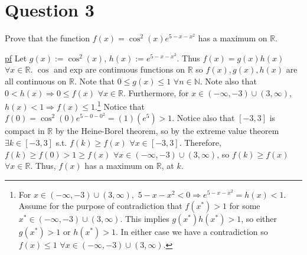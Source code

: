 \documentclass[11pt]{article} %
\begin{document}
\section{Question 3}
Prove that the function $f(x) = \cos^2 (x)e^{5-x-x^2}$ has a maximum on $\mathbb{R}$.

\underline{pf} Let $g(x):= \cos^2(x)$, $h(x):= e^{5-x-x^2}$. Thus $f(x) = g(x)h(x)$ $\forall x \in \mathbb{R}.$ $\cos$ and exp are continuous functions on $\mathbb{R}$ so $f(x),g(x),h(x)$ are all continuous on $\mathbb{R}$. Note that $0\leq g(x) \leq 1$ $\forall n \in \mathbb{N}.$ Note also that $0<h(x) \Rightarrow 0 \leq f(x) $ $\forall x \in \mathbb{R}$. Furthermore, for $x \in (-\infty,-3) \cup (3,\infty)$, $h(x) < 1 \Rightarrow f(x) \leq 1$.\footnote{For $x \in (-\infty,-3) \cup (3,\infty),$ $5-x-x^2<0 \Rightarrow e^{5 - x - x^2} = h(x) < 1.$ Assume for the purpose of contradiction that $f(x^*)>1$ for some $x^* \in (-\infty,-3) \cup (3,\infty).$ This implies $g(x^*)h(x^*) > 1$, so either $g(x^*)>1$ or $h(x^*) >1.$ In either case we have a contradiction so $f(x)\leq1$ $\forall x \in (-\infty,-3) \cup (3,\infty).$} Notice that $f(0) = \cos^2(0)e^{5 - 0 - 0^2} = (1)(e^5) > 1$. Notice also that $[-3,3]$ is compact in $\mathbb{R}$ by the Heine-Borel theorem, so by the extreme value theorem $\exists k \in [-3,3]$ s.t. $f(k) \geq f(x)$ $\forall x \in [-3,3]$. Therefore, $f(k) \geq f(0) > 1 \geq f(x)$ $\forall x \in (-\infty,-3) \cup (3,\infty)$, so $f(k) \geq f(x)$ $\forall x \in \mathbb{R}.$ Thus, $f(x)$ has a maximum on $\mathbb{R}$, at $k$.

\end{document}

